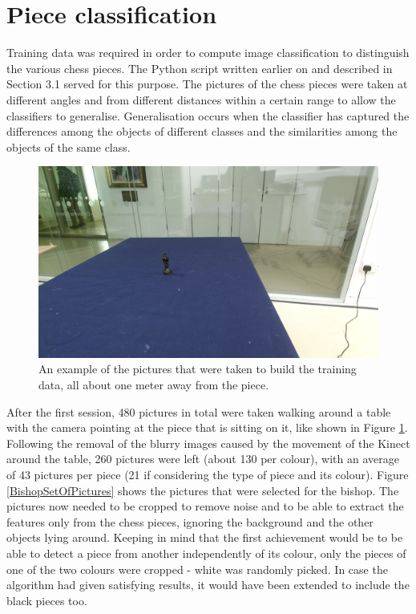 \documentclass{l4proj}
\begin{document}
\section{Piece classification} \label{PieceClassLabel}

Training data was required in order to compute image classification to distinguish the various chess pieces. The Python script written earlier on and described in Section 3.1 served for this purpose. The pictures of the chess pieces were taken at different angles and from different distances within a certain range to allow the classifiers to generalise. Generalisation occurs when the classifier has captured the differences among the objects of different classes and the similarities among the objects of the same class.

\begin{figure}[h!]
\centering
\includegraphics[scale=0.25]{king_on_table.jpeg}
\caption{An example of the pictures that were taken to build the training data, all about one meter away from the piece.}
\label{KinectPictureKing}
\end{figure}

After the first session, 480 pictures in total were taken walking around a table with the camera pointing at the piece that is sitting on it, like shown in Figure \ref{KinectPictureKing}. Following the removal of the blurry images caused by the movement of the Kinect around the table, 260 pictures were left (about 130 per colour), with an average of 43 pictures per piece (21 if considering the type of piece and its colour).  Figure \ref{BishopSetOfPictures} shows the pictures that were selected for the bishop. The pictures now needed to be cropped to remove noise and to be able to extract the features only from the chess pieces, ignoring the background and the other objects lying around. Keeping in mind that the first achievement would be to be able to detect a piece from another independently of its colour, only the pieces of one of the two colours were cropped - white was randomly picked. In case the algorithm had given satisfying results, it would have been extended to include the black pieces too. 
\end{document}

